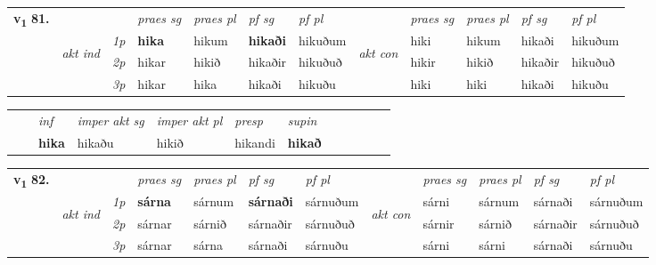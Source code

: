 \begin{tabular}{llllllllllll} \toprule
\multirow{4}{*}{{{\textbf{v{\textsubscript{1}}} \Large{\textbf{81.}}}}}  & &   &  \textit{praes sg}  & \textit{praes pl}  &\textit{ pf sg} & \textit{pf pl} &  &  \textit{praes sg}  & \textit{praes pl}  & \textit{pf sg} & \textit{pf pl } \\*
	\cmidrule{4-7} \cmidrule{9-12}
 & \multirow{3}{*}{\begin{turn}{90}\textit{akt ind}\end{turn}} & {\textit{1p}} & \textbf{hika} & hikum    & \textbf{hikaði} & hikuðum & \multirow{3}{*}{\begin{turn}{90}\textit{akt con}\end{turn}} &hiki & hikum & hikaði & hikuðum\\*
& &  {\textit{2p}} &  hikar  & hikið   & hikaðir & hikuðuð & & hikir & hikið & hikaðir & hikuðuð \\*
& &  {\textit{3p}} & hikar & hika   & hikaði & hikuðu & & hiki & hiki& hikaði & hikuðu  \\*
\cmidrule{4-7} \cmidrule{9-12}
\end{tabular}


\begin{tabular}{llllllllllll}
 & & \textit{inf} & \textit{imper akt sg} & \textit{imper akt pl}   & \textit{presp} & \textit{supin}       \\*
  & & \textbf{hika} & hikaðu  & hikið   & hikandi &  \textbf{hikað}   \\*
\cmidrule{1-12}
\end{tabular}



\begin{tabular}{llllllllllll} \toprule
\multirow{4}{*}{{{\textbf{v{\textsubscript{1}}} \Large{\textbf{82.}}}}}  & &   &  \textit{praes sg}  & \textit{praes pl}  &\textit{ pf sg} & \textit{pf pl} &  &  \textit{praes sg}  & \textit{praes pl}  & \textit{pf sg} & \textit{pf pl } \\*
	\cmidrule{4-7} \cmidrule{9-12}
 & \multirow{3}{*}{\begin{turn}{90}\textit{akt ind}\end{turn}} & {\textit{1p}} & \textbf{sárna} & sárnum    & \textbf{sárnaði} & sárnuðum & \multirow{3}{*}{\begin{turn}{90}\textit{akt con}\end{turn}} &sárni & sárnum & sárnaði & sárnuðum\\*
& &  {\textit{2p}} &  sárnar  & sárnið   & sárnaðir & sárnuðuð & & sárnir & sárnið & sárnaðir & sárnuðuð \\*
& &  {\textit{3p}} & sárnar & sárna   & sárnaði & sárnuðu & & sárni & sárni& sárnaði & sárnuðu  \\*
\cmidrule{4-7} \cmidrule{9-12}
\end{tabular}



